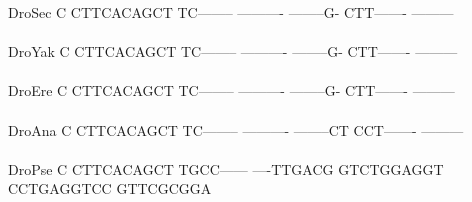 \documentclass[11pt,twoside,reqno,a4paper]{article}
\begin{document}
{DroSec	C	CTTCACAGCT	TC--------	----------	--------G-	CTT-------	---------\\
\hspace*{7\charwidth}\hspace*{1\charwidth}\hspace*{1\charwidth}\hspace*{1\charwidth}\hspace*{1\charwidth}\hspace*{1\charwidth}\hspace*{1\charwidth}\\
DroYak	C	CTTCACAGCT	TC--------	----------	--------G-	CTT-------	---------\\
\hspace*{7\charwidth}\hspace*{1\charwidth}\hspace*{1\charwidth}\hspace*{1\charwidth}\hspace*{1\charwidth}\hspace*{1\charwidth}\hspace*{1\charwidth}\\
DroEre	C	CTTCACAGCT	TC--------	----------	--------G-	CTT-------	---------\\
\hspace*{7\charwidth}\hspace*{1\charwidth}\hspace*{1\charwidth}\hspace*{1\charwidth}\hspace*{1\charwidth}\hspace*{1\charwidth}\hspace*{1\charwidth}\\
DroAna	C	CTTCACAGCT	TC--------	----------	--------CT	CCT-------	---------\\
\hspace*{7\charwidth}\hspace*{1\charwidth}\hspace*{1\charwidth}\hspace*{1\charwidth}\hspace*{1\charwidth}\hspace*{1\charwidth}\hspace*{1\charwidth}\\
DroPse	C	CTTCACAGCT	TGCC------	----TTGACG	GTCTGGAGGT	CCTGAGGTCC	GTTCGCGGA\\
\hspace*{7\charwidth}\hspace*{1\charwidth}\hspace*{1\charwidth}\hspace*{1\charwidth}\hspace*{1\charwidth}\hspace*{1\charwidth}\hspace*{1\charwidth}\\
}
\end{document}
